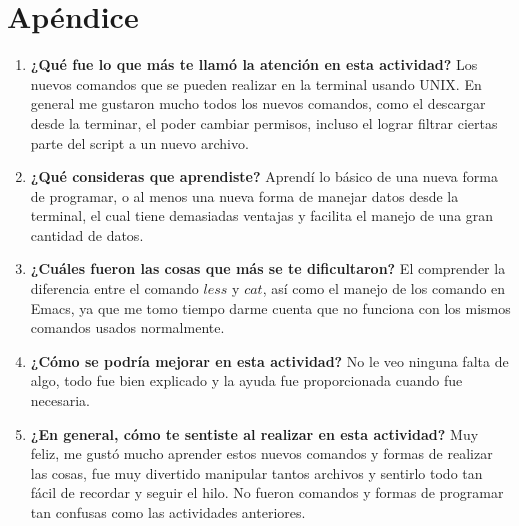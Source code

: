 \documentclass{article}
\begin{document}
\section{Apéndice}
\begin{enumerate}
\item \textbf{¿Qué fue lo que más te llamó la atención en esta actividad?} Los nuevos comandos que se pueden realizar en la terminal usando UNIX. En general me gustaron mucho todos los nuevos comandos, como el descargar desde la terminar, el poder cambiar permisos, incluso el lograr filtrar ciertas parte del script a un nuevo archivo.

\item \textbf{¿Qué consideras que aprendiste?} Aprendí lo básico de una nueva forma de programar, o al menos una nueva forma de manejar datos desde la terminal, el cual tiene demasiadas ventajas y facilita el manejo de una gran cantidad de datos.

\item \textbf{¿Cuáles fueron las cosas que más se te dificultaron?} El comprender la diferencia entre el comando $less$ y $cat$, así como el manejo de los comando en Emacs, ya que me tomo tiempo darme cuenta que no funciona con los mismos comandos usados normalmente.

\item \textbf{¿Cómo se podría mejorar en esta actividad?} No le veo ninguna falta de algo, todo fue bien explicado y la ayuda fue proporcionada cuando fue necesaria.

\item\textbf{¿En general, cómo te sentiste al realizar en esta actividad?} Muy feliz, me gustó mucho aprender estos nuevos comandos y formas de realizar las cosas, fue muy divertido manipular tantos archivos y sentirlo todo tan fácil de recordar y seguir el hilo. No fueron comandos y formas de programar tan confusas como las actividades anteriores.
\end{enumerate}
\end{document}

